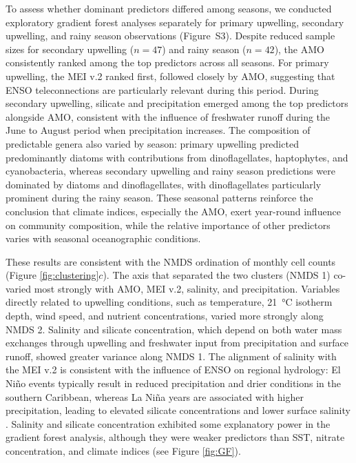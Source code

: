\documentclass[]{agujournal2019}
\begin{document}
    To assess whether dominant predictors differed among seasons, we conducted exploratory gradient forest analyses separately for primary upwelling, secondary upwelling, and rainy season observations (Figure~S3). Despite reduced sample sizes for secondary upwelling ($n = 47$) and rainy season ($n = 42$), the AMO consistently ranked among the top predictors across all seasons. For primary upwelling, the MEI v.2 ranked first, followed closely by AMO, suggesting that ENSO teleconnections are particularly relevant during this period. During secondary upwelling, silicate and precipitation emerged among the top predictors alongside AMO, consistent with the influence of freshwater runoff during the June to August period when precipitation increases. The composition of predictable genera also varied by season: primary upwelling predicted predominantly diatoms with contributions from dinoflagellates, haptophytes, and cyanobacteria, whereas secondary upwelling and rainy season predictions were dominated by diatoms and dinoflagellates, with dinoflagellates particularly prominent during the rainy season. These seasonal patterns reinforce the conclusion that climate indices, especially the AMO, exert year-round influence on community composition, while the relative importance of other predictors varies with seasonal oceanographic conditions.

    These results are consistent with the NMDS ordination of monthly cell counts (Figure \ref{fig:clustering}$c$). The axis that separated the two clusters (NMDS 1) co-varied most strongly with AMO, MEI v.2, salinity, and precipitation. Variables directly related to upwelling conditions, such as temperature, \qty{21}{\celsius} isotherm depth, wind speed, and nutrient concentrations, varied more strongly along NMDS 2. Salinity and silicate concentration, which depend on both water mass exchanges through upwelling and freshwater input from precipitation and surface runoff, showed greater variance along NMDS 1. The alignment of salinity with the MEI v.2 is consistent with the influence of ENSO on regional hydrology: El Niño events typically result in reduced precipitation and drier conditions in the southern Caribbean, whereas La Niña years are associated with higher precipitation, leading to elevated silicate concentrations and lower surface salinity \cite{giannini_interdecadal_2001}. Salinity and silicate concentration exhibited some explanatory power in the gradient forest analysis, although they were weaker predictors than SST, nitrate concentration, and climate indices (see Figure \ref{fig:GF}).
\end{document}
